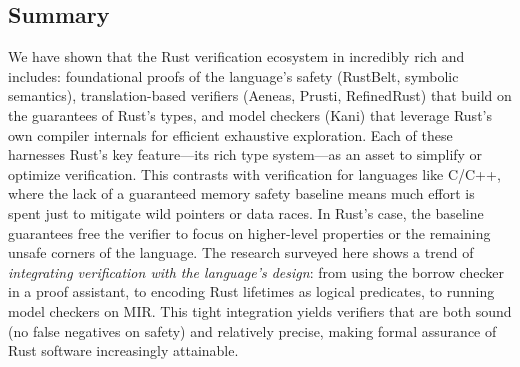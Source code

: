 \subsection{Summary}
We have shown that the Rust verification ecosystem in incredibly rich and includes: foundational proofs of the
language's safety (RustBelt, symbolic semantics), translation-based verifiers
(Aeneas, Prusti, RefinedRust) that build on the guarantees of Rust's types, and
model checkers (Kani) that leverage Rust's own compiler internals for efficient
exhaustive exploration. Each of these harnesses Rust's key feature—its rich type
system—as an asset to simplify or optimize verification. This contrasts with
verification for languages like C/C++, where the lack of a guaranteed memory
safety baseline means much effort is spent just to mitigate wild pointers or
data races. In Rust's case, the baseline guarantees free the verifier to focus
on higher-level properties or the remaining unsafe corners of the language. The
research surveyed here shows a trend of \textit{integrating verification with the
language's design}: from using the borrow checker in a proof assistant, to
encoding Rust lifetimes as logical predicates, to running model checkers on MIR.
This tight integration yields verifiers that are both sound (no false negatives
on safety) and relatively precise, making formal assurance of Rust software
increasingly attainable.

